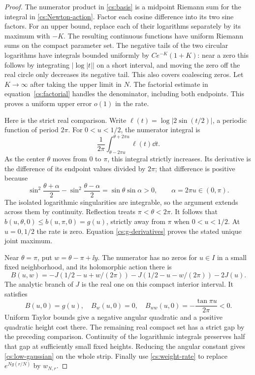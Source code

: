 \begin{proof}
The numerator product in \eqref{cs:basis} is a midpoint Riemann
sum for the integral in \eqref{cs:Newton-action}. Factor each cosine
difference into its two sine factors. For an upper bound,
replace each of their logarithms separately by its maximum with \(-K\). The resulting
continuous functions have uniform Riemann sums on the compact parameter
set. The negative tails of the two circular logarithms have integrals
bounded uniformly by \(C e^{-K}(1+K)\): near a zero this follows by
integrating \(|\log|t||\) on a short interval, and moving the zero off
the real circle only decreases its negative tail. This also covers
coalescing zeros. Let \(K\to\infty\) after taking the upper limit in
\(N\). The factorial estimate in equation~\eqref{cs:factorial} handles
the denominator, including both endpoints. This proves a uniform
upper error \(o(1)\) in the rate.

Here is the strict real comparison. Write
\(\ell(t)=\log|2\sin(t/2)|\), a periodic function of period \(2\pi\).
For \(0<u<1/2\), the numerator integral is
\[
 \frac1{2\pi}\int_{\theta-2\pi u}^{\theta+2\pi u}\ell(t)\dd t.
\]
As the center \(\theta\) moves from \(0\) to \(\pi\), this integral
strictly increases. Its derivative is the difference of its endpoint
values divided by \(2\pi\); that difference is positive because
\[
 \sin^2\frac{\theta+\alpha}{2}
       -\sin^2\frac{\theta-\alpha}{2}
       =\sin\theta\sin\alpha>0,
 \qquad \alpha=2\pi u\in(0,\pi).
\]
The isolated logarithmic singularities are integrable, so the argument
extends across them by continuity. Reflection treats \(\pi<\theta<2\pi\).
It follows that
\(b(u,\theta,0)\le b(u,\pi,0)=g(u)\), strictly away from \(\pi\)
when \(0<u<1/2\). At \(u=0,1/2\) the rate is zero. Equation
\eqref{cs:g-derivatives} proves the stated unique joint maximum.

Near \(\theta=\pi\), put \(w=\theta-\pi+\ii y\). The numerator
has no zeros for \(u\in I\) in a small fixed neighborhood, and its
holomorphic action there is
\begin{equation}\label{cs:B-action}
 B(u,w)=-J(1/2-u+w/(2\pi))-J(1/2-u-w/(2\pi))-2J(u).
\end{equation}
The analytic branch of \(J\) is the real one on this compact interior
interval. It satisfies
\[
 B(u,0)=g(u),\quad B_w(u,0)=0,\quad
 B_{ww}(u,0)=-\frac{\tan\pi u}{2\pi}<0.
\]
Uniform Taylor bounds give a negative angular quadratic and a positive
quadratic height cost there. The remaining real compact set has a
strict gap by the preceding comparison. Continuity of the logarithmic
integrals preserves half that gap at sufficiently small fixed heights.
Reducing the angular constant gives \eqref{cs:low-gaussian} on the
whole strip. Finally use \eqref{cs:weight-rate} to replace
\(e^{Ng(r/N)}\) by \(w_{N,r}\).
\end{proof}

